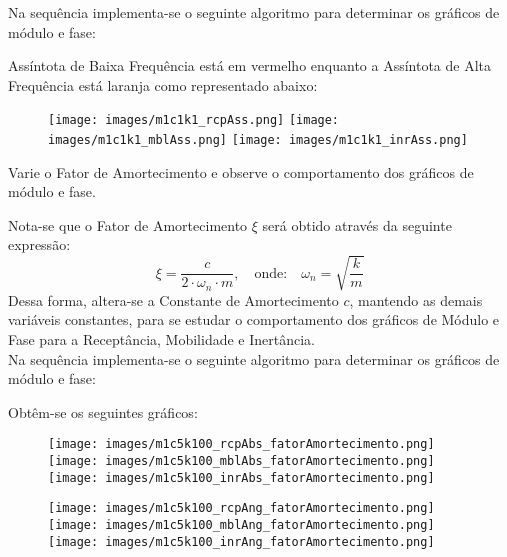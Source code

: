 \documentclass{article}
\begin{document}
\begin{resolution}
    Na sequência implementa-se o seguinte algoritmo para determinar os gráficos de módulo e fase:
    \begin{scriptsize}
        \myMatlab
    \end{scriptsize}
    Assíntota de Baixa Frequência está em vermelho enquanto a Assíntota de Alta Frequência está laranja como representado abaixo:
    \begin{figure}[H]
        \centering
        \texttt{[image: images/m1c1k1\_rcpAss.png]}
        \texttt{[image: images/m1c1k1\_mblAss.png]}
        \texttt{[image: images/m1c1k1\_inrAss.png]}
    \end{figure}
\end{resolution}

\newpage
\begin{exercise}\label{ex6}
    Varie o Fator de Amortecimento e observe o comportamento dos gráficos de módulo e fase.
\end{exercise}
\begin{resolution}
    Nota-se que o Fator de Amortecimento $\xi$ será obtido através da seguinte expressão:
    \begin{equation*}
        \xi = \frac{c}{2 \cdot \omega_n \cdot m}, 
        \quad \text{onde:} \quad
        \omega_n = \sqrt{\frac{k}{m}}
    \end{equation*}
    Dessa forma, altera-se a Constante de Amortecimento $c$, mantendo as demais variáveis constantes, para se estudar o comportamento dos gráficos de Módulo e Fase para a Receptância, Mobilidade e Inertância.\\

    \noindent Na sequência implementa-se o seguinte algoritmo para determinar os gráficos de módulo e fase:
    \begin{scriptsize}
        \myMatlab
    \end{scriptsize}
    Obtêm-se os seguintes gráficos:
    \begin{figure}[H]
        \centering
        \texttt{[image: images/m1c5k100\_rcpAbs\_fatorAmortecimento.png]}
        \texttt{[image: images/m1c5k100\_mblAbs\_fatorAmortecimento.png]}
        \texttt{[image: images/m1c5k100\_inrAbs\_fatorAmortecimento.png]}
    \end{figure}
    \begin{figure}[H]
        \centering
        \texttt{[image: images/m1c5k100\_rcpAng\_fatorAmortecimento.png]}
        \texttt{[image: images/m1c5k100\_mblAng\_fatorAmortecimento.png]}
        \texttt{[image: images/m1c5k100\_inrAng\_fatorAmortecimento.png]}
    \end{figure}
\end{resolution}
\end{document}
